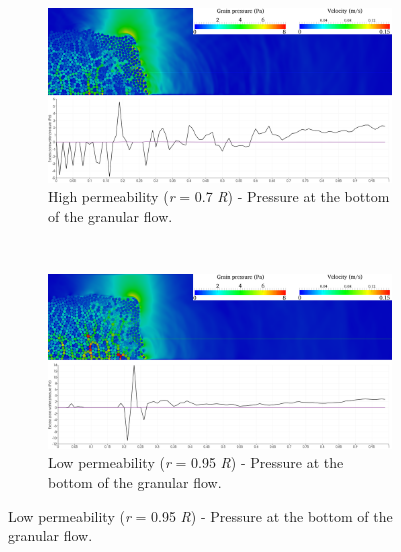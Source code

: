 \documentclass[12pt,a4paper,twocolumn,fleqn]{narms}
\begin{document}
\begin{figure}
\centering
\begin{subfigure}[t]{0.975\linewidth}
	\centering
    \includegraphics[width=\linewidth]{figs/a08/r07_PWP_ini_dense}
    \caption{High permeability (\textit{r} = 0.7 \textit{R}) - Pressure at the 
        bottom of the granular flow.}
    \label{fig:r07_PWP_ini_dense}
\end{subfigure} \\
\begin{subfigure}[t]{0.975\linewidth}
	\centering
    \includegraphics[width=\linewidth]{figs/a08/r095_PWP_ini_dense}
    \caption{Low permeability (\textit{r} = 0.95 \textit{R}) - Pressure at the 
        bottom of the granular flow.}
    \label{fig:r095_PWP_ini_dense}
\end{subfigure}
\end{figure}
\end{document}
